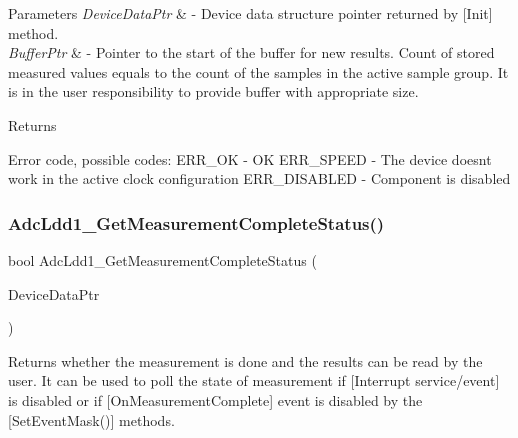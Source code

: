 \begin{DoxyParams}{Parameters}
{\em Device\+Data\+Ptr} & -\/ Device data structure pointer returned by \mbox{[}Init\mbox{]} method. \\
\hline
{\em Buffer\+Ptr} & -\/ Pointer to the start of the buffer for new results. Count of stored measured values equals to the count of the samples in the active sample group. It is in the user responsibility to provide buffer with appropriate size. \\
\hline
\end{DoxyParams}
\begin{DoxyReturn}{Returns}

\begin{DoxyItemize}
\item Error code, possible codes\+: E\+R\+R\+\_\+\+OK -\/ OK E\+R\+R\+\_\+\+S\+P\+E\+ED -\/ The device doesn\textquotesingle{}t work in the active clock configuration E\+R\+R\+\_\+\+D\+I\+S\+A\+B\+L\+ED -\/ Component is disabled 
\end{DoxyItemize}
\end{DoxyReturn}
\mbox{\label{group___adc_ldd1__module_ga4df44002c6ba3479f104deedd98b7e4e}} 
\subsubsection{\texorpdfstring{Adc\+Ldd1\+\_\+\+Get\+Measurement\+Complete\+Status()}{AdcLdd1\_GetMeasurementCompleteStatus()}}
{\footnotesize\ttfamily bool Adc\+Ldd1\+\_\+\+Get\+Measurement\+Complete\+Status (\begin{DoxyParamCaption}\item[{\hyperlink{group___p_e___types__module_gac5cf1362f1f0e3a2ce71b1bf2276d091}{L\+D\+D\+\_\+\+T\+Device\+Data} $\ast$}]{Device\+Data\+Ptr }\end{DoxyParamCaption})}



Returns whether the measurement is done and the results can be read by the user. It can be used to poll the state of measurement if \mbox{[}Interrupt service/event\mbox{]} is disabled or if \mbox{[}On\+Measurement\+Complete\mbox{]} event is disabled by the \mbox{[}Set\+Event\+Mask()\mbox{]} methods. 


